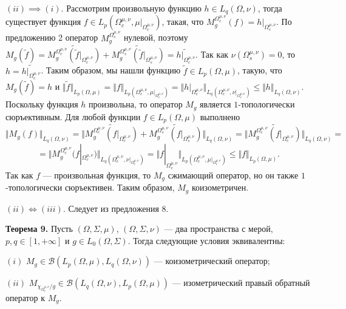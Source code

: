 \documentclass[11pt,twoside]{article}
\begin{document}
$(ii)$$\implies$$ (i)$. Рассмотрим произвольную функцию $h\in
L_q(\Omega,\nu)$, тогда существует функция $f\in
L_p(\Omega_c^{\mu,\nu},\mu|_{\Omega_c^{\mu,\nu}})$, такая, что
$M_g^{\Omega_c^{\mu,\nu}}(f)=h|_{\Omega_c^{\mu,\nu}}$. По предложению 2
оператор $M_g^{\Omega_s^{\mu,\nu}}$ нулевой, поэтому $M_g(\widetilde{f})
=\widetilde{M_g^{\Omega_c^{\mu,\nu}}
(\widetilde{f}|_{\Omega_c^{\mu,\nu}})}
+\widetilde{M_g^{\Omega_s^{\mu,\nu}}
(\widetilde{f}|_{\Omega_s^{\mu,\nu}})}
=\widetilde{h|_{\Omega_c^{\mu,\nu}}}$. Так как
$\nu(\Omega_s^{\mu,\nu})=0$, то $h=\widetilde{h|_{\Omega_c^{\mu,\nu}}}$.
Таким образом, мы нашли функцию $\widetilde{f}\in L_p(\Omega,\mu)$,
такую, что $M_g(\widetilde{f})=h$ и $\Vert
\widetilde{f}\Vert_{L_p(\Omega,\mu)}=\Vert
f\Vert_{L_p(\Omega_c^{\mu,\nu},\mu|_{\Omega_c^{\mu,\nu}})}=
\Vert
h|_{\Omega_c^{\mu,\nu}}
\Vert_{L_q(\Omega_c^{\mu,\nu},\nu|_{\Omega_c^{\mu,\nu}})}
\leq\Vert h\Vert_{L_q(\Omega,\nu)}$. Поскольку функция $h$ произвольна,
то оператор $M_g$ является $1$-топологически сюръективным. Для любой
функции $f\in L_p(\Omega,\mu)$ выполнено
$$
    \Vert M_g(f)\Vert_{L_q(\Omega,\nu)}
    =\Vert
    \widetilde{M_g^{\Omega_c^{\mu,\nu}}(f|_{\Omega_c^{\mu,\nu}})}
    +\widetilde{M_g^{\Omega_s^{\mu,\nu}}(f|_{\Omega_s^{\mu,\nu}})}
    \Vert_{L_q(\Omega,\nu)}
    =\Vert
    \widetilde{M_g^{\Omega_c^{\mu,\nu}}(f|_{\Omega_c^{\mu,\nu}})}
    \Vert_{L_q(\Omega,\nu)}=
$$
$$
    =\Vert
    M_g^{\Omega_c^{\mu,\nu}}(f|_{\Omega_c^{\mu,\nu}})
    \Vert_{L_q(\Omega_c^{\mu,\nu},\nu|_{\Omega_c^{\mu,\nu}})}
    =\Vert
    f|_{\Omega_c^{\mu,\nu}}
    \Vert_{L_p(\Omega_c^{\mu,\nu},\mu|_{\Omega_c^{\mu,\nu}})}
    \leq\Vert f \Vert_{L_p(\Omega,\mu)}.
$$
Так как $f$ --- произвольная функция, то $M_g$ сжимающий оператор, но он также
$1$-топологически сюръективен. Таким образом, $M_g$ коизометричен.

$(ii)\Longleftrightarrow (iii)$. Следует из предложения 8.

\textbf{Теорема 9.} Пусть  $(\Omega,\Sigma,\mu)$, $(\Omega,\Sigma,\nu)$ --- два
пространства с мерой, $p,q\in[1,+\infty]$ и $g\in L_0(\Omega,\Sigma)$. Тогда
следующие условия эквивалентны:

$(i)$ $M_g\in\mathcal{B}(L_p(\Omega,\mu),L_q(\Omega,\nu))$ --- коизометрический
оператор;

$(ii)$ $M_{\chi_{\Omega_c^{\mu,\nu}}/g}\in
    \mathcal{B}(L_q(\Omega,\nu), L_p(\Omega,\mu))$ --- изометрический правый
обратный оператор к $M_g$.
\end{document}
